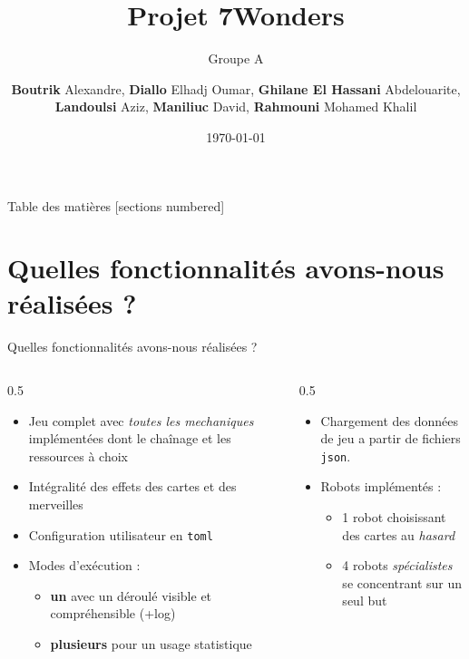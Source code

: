 \documentclass[10pt,french]{beamer}
\title{Projet 7Wonders}
\subtitle{Groupe A}
\date{\today}
\institute{Universit\'{e} C\^{o}te d'Azur}
\author{\textbf{Boutrik} Alexandre, \textbf{Diallo} Elhadj Oumar, \newline \textbf{Ghilane El Hassani} Abdelouarite, \textbf{Landoulsi} Aziz, \newline \textbf{Maniliuc} David, \textbf{Rahmouni} Mohamed Khalil}
\begin{document}
\maketitle

\begin{frame}{Table des matières}
  [sections numbered]
  \tableofcontents[hideallsubsections]
\end{frame}

\section{Quelles fonctionnalités avons-nous réalisées ?}

\begin{frame}{Quelles fonctionnalités avons-nous réalisées ?}
    \begin{columns}
        \begin{column}{0.5\textwidth}
            \begin{itemize}
                \item Jeu complet avec \textit{toutes les mechaniques} implémentées dont le chaînage et les ressources à choix
                \item Intégralité des effets des cartes et des merveilles
                \item Configuration utilisateur en \texttt{toml}
                \item Modes d'exécution :
                  \begin{itemize}
                    \item \textbf{un} avec un déroulé visible et compréhensible (+log)
                    \item \textbf{plusieurs} pour un usage statistique
                  \end{itemize}
            \end{itemize}
        \end{column}
        \begin{column}{0.5\textwidth}
            \begin{itemize}
                \item Chargement des données de jeu a partir de fichiers \texttt{json}.
                \item Robots implémentés :
                  \begin{itemize}
                    \item 1 robot choisissant des cartes au \textit{hasard}
                    \item 4 robots \textit{spécialistes} se concentrant sur un seul but

\end{itemize}
\end{itemize}
\end{column}
\end{columns}
\end{frame}
\end{document}
